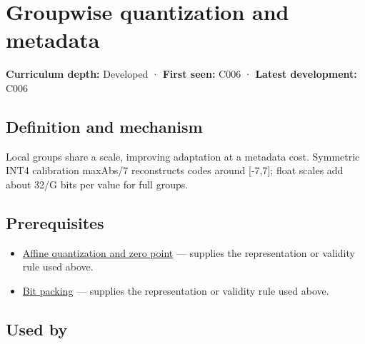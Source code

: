 \hypertarget{appendix-638204c40e8b}{}\label{referencestart:appendix-638204c40e8b}
\section{Groupwise quantization and metadata}\label{appendix-638204c40e8b-groupwise-quantization-and-metadata}

\hypertarget{appendix-638204c40e8b-groupwise-quantization-and-metadata}{}

\textbf{Curriculum depth:} Developed · \textbf{First seen:} C006 · \textbf{Latest development:} C006

\begin{allmightroledefinition}

\subsection{Definition and mechanism}\label{appendix-638204c40e8b-definition-and-mechanism}

\hypertarget{appendix-638204c40e8b-definition-and-mechanism}{}

Local groups share a scale, improving adaptation at a metadata cost. Symmetric INT4 calibration maxAbs/7 reconstructs codes around {[}-7,7{]}; float scales add about 32/G bits per value for full groups.

\end{allmightroledefinition}

\subsection{Prerequisites}\label{appendix-638204c40e8b-prerequisites}

\hypertarget{appendix-638204c40e8b-prerequisites}{}

\begin{itemize}
\tightlist
\item
  \hyperref[appendix-d5da3eaabaef]{Affine quantization and zero point} --- supplies the representation or validity rule used above.
\item
  \hyperref[appendix-1f9963e1a5d1]{Bit packing} --- supplies the representation or validity rule used above.
\end{itemize}

\subsection{Used by}\label{appendix-638204c40e8b-used-by}

